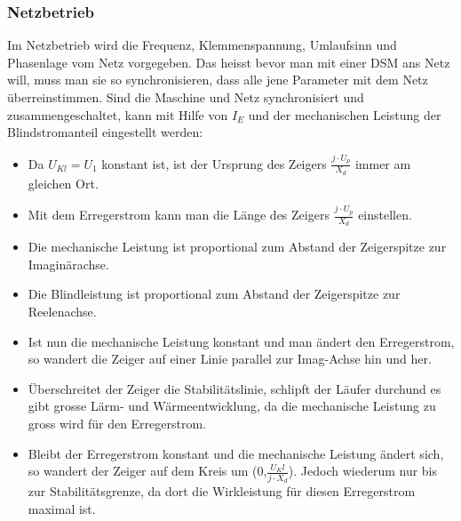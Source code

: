     \subsubsection{Netzbetrieb}
        Im Netzbetrieb wird die Frequenz, Klemmenspannung, Umlaufsinn und Phasenlage vom Netz vorgegeben. Das heisst bevor man mit einer DSM ans Netz will, muss man sie so synchronisieren, dass alle jene Parameter mit dem Netz überreinstimmen. Sind die Maschine und Netz synchronisiert und zusammengeschaltet, kann mit Hilfe von $I_E$ und der mechanischen Leistung der Blindstromanteil eingestellt werden: \\
        \begin{minipage}{8.2cm}
        \end{minipage}
        \begin{minipage}{9.7cm}
            \begin{itemize}
                \item Da $U_{Kl} = U_1$ konstant ist, ist der Ursprung des Zeigers $\frac{j \cdot U_p}{X_d}$ immer am gleichen Ort. 
                \item Mit dem Erregerstrom kann man die Länge des Zeigers $\frac{j \cdot U_p}{X_d}$ einstellen.
                \item Die mechanische Leistung ist proportional zum Abstand der Zeigerspitze zur Imaginärachse.
                \item Die Blindleistung ist proportional zum Abstand  der Zeigerspitze zur Reelenachse.
                \item Ist nun die mechanische Leistung konstant und man ändert den Erregerstrom, so wandert die Zeiger auf einer Linie parallel zur Imag-Achse hin und her.
                \item Überschreitet der Zeiger die Stabilitätslinie, schlipft der Läufer durchund es gibt grosse Lärm- und Wärmeentwicklung, da die mechanische Leistung zu gross wird für den Erregerstrom.
                \item Bleibt der Erregerstrom konstant und die mechanische Leistung ändert sich, so wandert der Zeiger auf dem Kreis um (0,$\frac{U_Kl}{j \cdot X_d}$). Jedoch wiederum nur bis zur Stabilitätsgrenze, da dort die Wirkleistung für diesen Erregerstrom maximal ist.
            \end{itemize}
        \end{minipage}
       